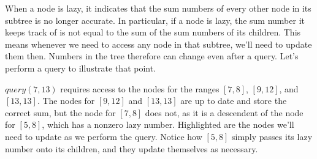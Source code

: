 When a node is lazy, it indicates that the sum numbers of every other node in its subtree is no longer accurate. In particular, if a node is lazy, the sum number it keeps track of is not equal to the sum of the sum numbers of its children. This means whenever we need to access any node in that subtree, we'll need to update them then. Numbers in the tree therefore can change even after a query. Let's perform a query to illustrate that point.

$query(7,13)$ requires access to the nodes for the ranges $[7,8]$, $[9,12]$, and $[13,13]$. The nodes for $[9,12]$ and $[13,13]$ are up to date and store the correct sum, but the node for $[7,8]$ does not, as it is a descendent of the node for $[5,8]$, which has a nonzero lazy number. Highlighted are the nodes we'll need to update as we perform the query. Notice how $[5,8]$ simply passes its lazy number onto its children, and they update themselves as necessary.

